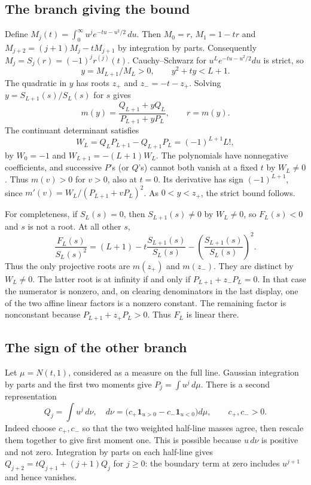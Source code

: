 \documentclass[11pt,a4paper]{article}
\numberwithin{equation}{section}
\theoremstyle{definition}
\theoremstyle{remark}
\begin{document}
\subsection{The branch giving the bound}
Define $M_j(t)=\int_0^\infty u^j e^{-tu-u^2/2}\,du$. Then $M_0=r$, $M_1=1-tr$ and
$M_{j+2}=(j+1)M_j-tM_{j+1}$ by integration by parts. Consequently $M_j=S_j(r)=(-1)^jr^{(j)}(t)$.
Cauchy--Schwarz for $u^L e^{-tu-u^2/2}du$ is strict, so
\[
y=M_{L+1}/M_L>0,\qquad y^2+ty<L+1.
\]
The quadratic in $y$ has roots $z_+$ and $z_-=-t-z_+$. Solving $y=S_{L+1}(s)/S_L(s)$ for $s$ gives
\[
 m(y)=\frac{Q_{L+1}+yQ_L}{P_{L+1}+yP_L},\qquad r=m(y).
\]
The continuant determinant satisfies
\[
 W_L=Q_LP_{L+1}-Q_{L+1}P_L=(-1)^{L+1}L!,
\]
by $W_0=-1$ and $W_{L+1}=-(L+1)W_L$. The polynomials have nonnegative coefficients, and successive $P$'s (or $Q$'s) cannot both vanish at a fixed $t$ by $W_L\ne0$. Thus $m(v)>0$ for $v>0$, also at $t=0$. Its derivative has sign $(-1)^{L+1}$, since $m'(v)=W_L/(P_{L+1}+vP_L)^2$. As $0<y<z_+$, the strict bound follows.

For completeness, if $S_L(s)=0$, then $S_{L+1}(s)\ne0$ by $W_L\ne0$, so $F_L(s)<0$ and $s$ is not a root. At all other $s$,
\[
 \frac{F_L(s)}{S_L(s)^2}
 =(L+1)-t\frac{S_{L+1}(s)}{S_L(s)}
 -\left(\frac{S_{L+1}(s)}{S_L(s)}\right)^2.
\]
Thus the only projective roots are $m(z_+)$ and $m(z_-)$. They are distinct by $W_L\ne0$. The latter root is at infinity if and only if $P_{L+1}+z_-P_L=0$. In that case the numerator is nonzero, and, on clearing denominators in the last display, one of the two affine linear factors is a nonzero constant. The remaining factor is nonconstant because $P_{L+1}+z_+P_L>0$. Thus $F_L$ is linear there.

\subsection{The sign of the other branch}
Let $\mu=N(t,1)$, considered as a measure on the full line. Gaussian integration by parts and the first two moments give
$P_j=\int u^j\,d\mu$. There is a second representation
\[
 Q_j=\int u^j\,d\nu,\quad
 d\nu=\big(c_+\mathbf 1_{u>0}-c_-\mathbf 1_{u<0}\big)d\mu,\qquad c_+,c_->0.
\]
Indeed choose $c_+,c_-$ so that the two weighted half-line masses agree, then rescale them together to give first moment one. This is possible because $u\,d\nu$ is positive and not zero. Integration by parts on each half-line gives
$Q_{j+2}=tQ_{j+1}+(j+1)Q_j$ for $j\ge0$: the boundary term at zero includes $u^{j+1}$ and hence vanishes.
\end{document}
